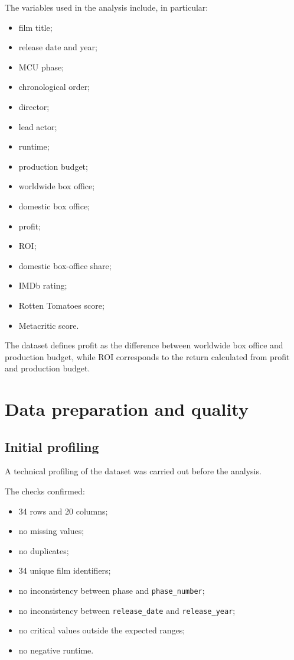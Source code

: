 \documentclass[a4paper,11pt]{article}
\newcommand{\varname}[1]{\texttt{#1}}
\begin{document}
The variables used in the analysis include, in particular:
\begin{itemize}
  \item film title;
  \item release date and year;
  \item MCU phase;
  \item chronological order;
  \item director;
  \item lead actor;
  \item runtime;
  \item production budget;
  \item worldwide box office;
  \item domestic box office;
  \item profit;
  \item ROI;
  \item domestic box-office share;
  \item IMDb rating;
  \item Rotten Tomatoes score;
  \item Metacritic score.
\end{itemize}

The dataset defines profit as the difference between worldwide box office
and production budget, while ROI corresponds to the return calculated
from profit and production budget.

\section{Data preparation and quality}

\subsection{Initial profiling}

A technical profiling of the dataset was carried out before the analysis.

The checks confirmed:
\begin{itemize}
  \item 34 rows and 20 columns;
  \item no missing values;
  \item no duplicates;
  \item 34 unique film identifiers;
  \item no inconsistency between phase and \varname{phase\_number};
  \item no inconsistency between \varname{release\_date} and
        \varname{release\_year};
  \item no critical values outside the expected ranges;
  \item no negative runtime.
\end{itemize}
\end{document}
